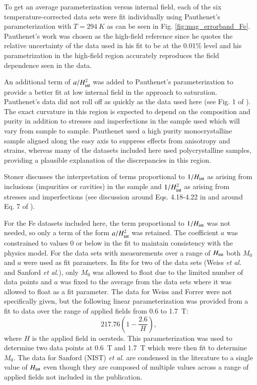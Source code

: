 \documentclass[preprint,12pt]{elsarticle}
\begin{document}
To get an average parameterization versus internal field, each of the six temperature-corrected data sets were fit individually using Pauthenet's parameterization with $T=294~K$ as can be seen in Fig. \ref{fig:mag_errorband_Fe}. Pauthenet's work was chosen as the high-field reference since he quotes the relative uncertainty of the data used in his fit to be at the 0.01\% level and his parametrization in the high-field region accurately reproduces the field dependence seen in the data. 

An additional term of $a/H_{\rm int}^2$ was added to Pauthenet's parameterization to provide a better fit at low internal field in the approach to saturation. Pauthenet's data  did not roll off as quickly as the data used here (see Fig. 1 of \cite{PauthenetMar1982}). The exact curvature in this region is expected to depend on the composition and purity in addition to stresses and imperfections in the sample used which will vary from sample to sample. Pauthenet used a high purity monocrystalline sample aligned along the easy axis to suppress effects from anisotropy and strains, whereas many of the datasets included here used polycrystalline samples, providing a plausible explanation of the discrepancies in this region. 

Stoner discusses the interpretation of terms proportional to $1/H_{\rm int}$ as arising from inclusions (impurities or cavities) in the sample and $1/H_{\rm int}^2$ as arising from stresses and imperfections (see discussion around Eqs. 4.18-4.22 in \cite{Stoner1950} and around Eq. 7 of \cite{Foner1956}). 

For the Fe datasets included here, the term proportional to $1/H_{\rm int}$ was not needed, so only a term of the form $a/H_{\rm int}^2$ was retained. The coefficient $a$ was constrained to values 0 or below in the fit to maintain consistency with the physics model. For the data sets with measurements over a range of $H_{\rm int}$ both $M_0$ and $a$ were used as fit parameters. In fits for two of the data sets (Weiss {\it et al.} and Sanford {\it et al.}), only $M_0$ was allowed to float due to the limited number of data points and $a$ was fixed to the average from the data sets where it was allowed to float as a fit parameter. The data for Weiss and Forrer were not specifically given, but the following linear parameterization was provided from a fit to data over the range of applied fields from 0.6 to 1.7~T: \cite{Weiss1929}
\[
217.76\left(1-\frac{2.6}{H}\right),
\]
where $H$ is the applied field in oersteds. This parameterization was used to determine two data points at 0.6~T and 1.7~T which were then fit to determine $M_0$. The data for Sanford (NIST) {\it et al.} are condensed in the literature to a single value of $H_{\rm int}$ even though they are composed of multiple values across a range of applied fields not included in the publication. 
\end{document}
